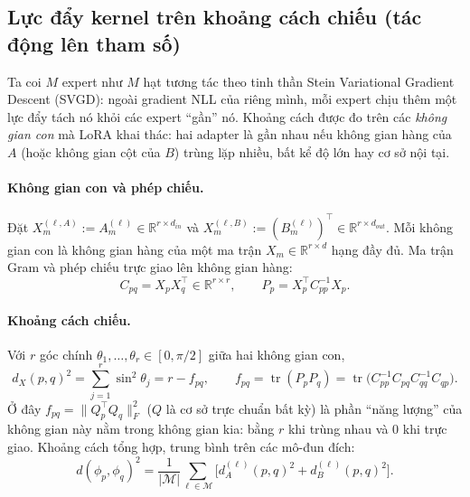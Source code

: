 \documentclass[12pt,a4paper]{article}
\theoremstyle{plain}
\begin{document}
\subsection{Lực đẩy kernel trên khoảng cách chiếu (tác động lên tham số)}
\label{sec:rep}

Ta coi $M$ expert như $M$ hạt tương tác theo tinh thần Stein Variational Gradient Descent (SVGD): ngoài gradient NLL của riêng mình, mỗi expert chịu thêm một lực đẩy tách nó khỏi các expert ``gần'' nó. Khoảng cách được đo trên các \emph{không gian con} mà LoRA khai thác: hai adapter là gần nhau nếu không gian hàng của $A$ (hoặc không gian cột của $B$) trùng lặp nhiều, bất kể độ lớn hay cơ sở nội tại.

\paragraph{Không gian con và phép chiếu.}
Đặt $X_m^{(\ell,A)}:=A_m^{(\ell)}\in\mathbb R^{r\times d_{in}}$ và $X_m^{(\ell,B)}:=(B_m^{(\ell)})^{\top}\in\mathbb R^{r\times d_{out}}$. Mỗi không gian con là không gian hàng của một ma trận $X_m\in\mathbb R^{r\times d}$ hạng đầy đủ. Ma trận Gram và phép chiếu trực giao lên không gian hàng:
\begin{equation}
\label{eq:gram}
C_{pq}=X_pX_q^{\top}\in\mathbb R^{r\times r},\qquad P_p=X_p^{\top}C_{pp}^{-1}X_p .
\end{equation}

\paragraph{Khoảng cách chiếu.}
Với $r$ góc chính $\theta_1,\dots,\theta_r\in[0,\pi/2]$ giữa hai không gian con,
\begin{equation}
\label{eq:projdist}
d_{X}(p,q)^2=\sum_{j=1}^{r}\sin^2\theta_j=r-f_{pq},\qquad
f_{pq}=\operatorname{tr}(P_pP_q)=\operatorname{tr}\!\big(C_{pp}^{-1}C_{pq}C_{qq}^{-1}C_{qp}\big).
\end{equation}
Ở đây $f_{pq}=\|Q_p^\top Q_q\|_F^2$ ($Q$ là cơ sở trực chuẩn bất kỳ) là phần ``năng lượng'' của không gian này nằm trong không gian kia: bằng $r$ khi trùng nhau và $0$ khi trực giao. Khoảng cách tổng hợp, trung bình trên các mô-đun đích:
\begin{equation}
\label{eq:grasstotal}
d(\phi_p,\phi_q)^2=\frac1{|\mathcal M|}\sum_{\ell\in\mathcal M}\Big[d_{A}^{(\ell)}(p,q)^2+d_{B}^{(\ell)}(p,q)^2\Big].
\end{equation}
\end{document}
